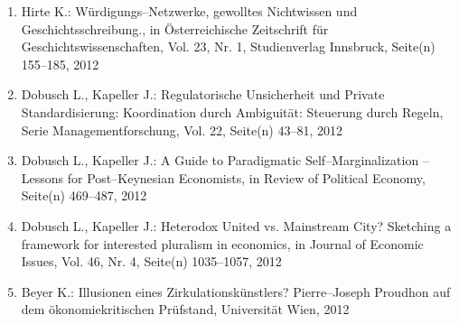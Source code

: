 \begin{enumerate}
	 \item Hirte K.: Würdigungs--Netzwerke, gewolltes Nichtwissen und Geschichtsschreibung., in Österreichische Zeitschrift für Geschichtswissenschaften, Vol. 23, Nr. 1, Studienverlag Innsbruck, Seite(n) 155--185, 2012
	 \item Dobusch L., Kapeller J.: Regulatorische Unsicherheit und Private Standardisierung: Koordination durch Ambiguität: Steuerung durch Regeln, Serie Managementforschung, Vol. 22, Seite(n) 43--81, 2012
	 \item Dobusch L., Kapeller J.: A Guide to Paradigmatic Self--Marginalization -- Lessons for Post--Keynesian Economists, in Review of Political Economy, Seite(n) 469--487, 2012
	 \item Dobusch L., Kapeller J.: Heterodox United vs. Mainstream City? Sketching a framework for interested pluralism in economics, in Journal of Economic Issues, Vol. 46, Nr. 4, Seite(n) 1035--1057, 2012
	 \item Beyer K.: Illusionen eines Zirkulationskünstlers? Pierre--Joseph Proudhon auf dem ökonomiekritischen Prüfstand, Universität Wien, 2012
\end{enumerate}
